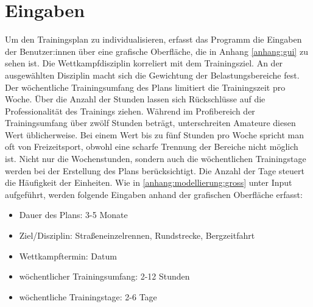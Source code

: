\section{Eingaben}
Um den Trainingsplan zu individualisieren, erfasst das Programm die Eingaben der Benutzer:innen über eine grafische Oberfläche, die in Anhang \ref{anhang:gui} zu sehen ist. Die Wettkampfdisziplin korreliert mit dem Trainingsziel. An der ausgewählten Disziplin macht sich die Gewichtung der Belastungsbereiche fest. Der wöchentliche Trainingsumfang des Plans limitiert die Trainingszeit pro Woche. Über die Anzahl der Stunden lassen sich Rückschlüsse auf die Professionalität des Trainings ziehen. Während im Profibereich der Trainingsumfang über zwölf Stunden beträgt, unterschreiten Amateure diesen Wert üblicherweise. Bei einem Wert bis zu fünf Stunden pro Woche spricht man oft von Freizeitsport, obwohl eine scharfe Trennung der Bereiche nicht möglich ist.\newline
Nicht nur die Wochenstunden, sondern auch die wöchentlichen Trainingstage werden bei der Erstellung des Plans berücksichtigt. Die Anzahl der Tage steuert die Häufigkeit der Einheiten.
Wie in \ref{anhang:modellierung:gross} unter Input aufgeführt, werden folgende Eingaben anhand der grafischen Oberfläche erfasst:
\begin{itemize}[parsep=2t, topsep=2pt]
    \item Dauer des Plans: 3-5 Monate
    \item Ziel/Disziplin: Straßeneinzelrennen, Rundstrecke, Bergzeitfahrt
    \item Wettkampftermin: Datum
    \item wöchentlicher Trainingsumfang: 2-12 Stunden 
    \item wöchentliche Trainingstage: 2-6 Tage
\end{itemize}
    

